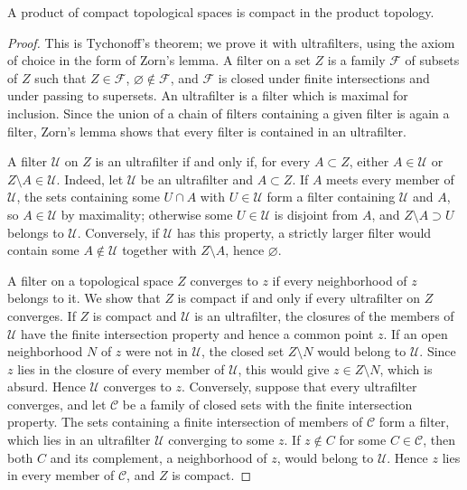 \begin{lemma}\label{lem:compact-product}
A product of compact topological spaces is compact in the product topology.
\end{lemma}
\begin{proof}
This is Tychonoff's theorem; we prove it with ultrafilters, using the axiom of choice in the form of Zorn's lemma. A filter on a set $Z$ is a family $\mathcal F$ of subsets of $Z$ such that $Z\in\mathcal F$, $\varnothing\notin\mathcal F$, and $\mathcal F$ is closed under finite intersections and under passing to supersets. An ultrafilter is a filter which is maximal for inclusion. Since the union of a chain of filters containing a given filter is again a filter, Zorn's lemma shows that every filter is contained in an ultrafilter.

A filter $\mathcal U$ on $Z$ is an ultrafilter if and only if, for every $A\subset Z$, either $A\in\mathcal U$ or $Z\setminus A\in\mathcal U$. Indeed, let $\mathcal U$ be an ultrafilter and $A\subset Z$. If $A$ meets every member of $\mathcal U$, the sets containing some $U\cap A$ with $U\in\mathcal U$ form a filter containing $\mathcal U$ and $A$, so $A\in\mathcal U$ by maximality; otherwise some $U\in\mathcal U$ is disjoint from $A$, and $Z\setminus A\supset U$ belongs to $\mathcal U$. Conversely, if $\mathcal U$ has this property, a strictly larger filter would contain some $A\notin\mathcal U$ together with $Z\setminus A$, hence $\varnothing$.

A filter on a topological space $Z$ converges to $z$ if every neighborhood of $z$ belongs to it. We show that $Z$ is compact if and only if every ultrafilter on $Z$ converges. If $Z$ is compact and $\mathcal U$ is an ultrafilter, the closures of the members of $\mathcal U$ have the finite intersection property and hence a common point $z$. If an open neighborhood $N$ of $z$ were not in $\mathcal U$, the closed set $Z\setminus N$ would belong to $\mathcal U$. Since $z$ lies in the closure of every member of $\mathcal U$, this would give $z\in Z\setminus N$, which is absurd. Hence $\mathcal U$ converges to $z$. Conversely, suppose that every ultrafilter converges, and let $\mathcal C$ be a family of closed sets with the finite intersection property. The sets containing a finite intersection of members of $\mathcal C$ form a filter, which lies in an ultrafilter $\mathcal U$ converging to some $z$. If $z\notin C$ for some $C\in\mathcal C$, then both $C$ and its complement, a neighborhood of $z$, would belong to $\mathcal U$. Hence $z$ lies in every member of $\mathcal C$, and $Z$ is compact.


\end{proof}
